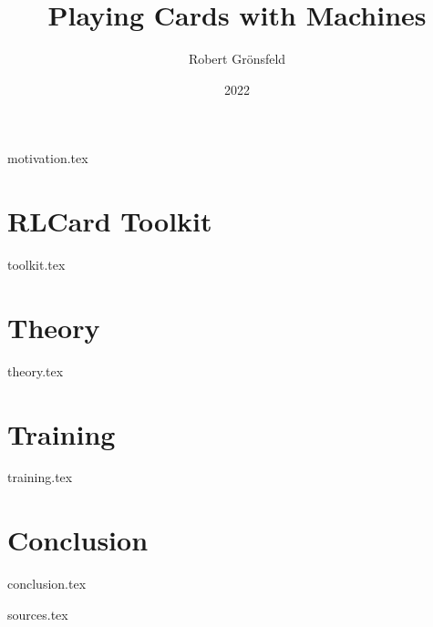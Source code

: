 \documentclass[aspectratio=169,table,svgnames]{beamer}
\title{Playing Cards with Machines}
\author{Robert Grönsfeld}
\institute{Baloise}
\date{2022}
\begin{document}
\frame{\titlepage}

{motivation.tex}

\part{RLCard Toolkit}
\frame{\partpage}
{toolkit.tex}

\part{Theory}
\frame{\partpage}
{theory.tex}

\part{Training}
\frame{\partpage}
{training.tex}

\part{Conclusion}
\frame{\partpage}
{conclusion.tex}

{sources.tex}
\end{document}

